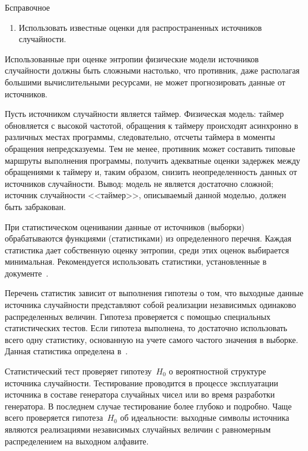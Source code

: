 \begin{appendix}{Б}{справочное}
\begin{enumerate}
\begin{example}
В проведенных экспериментах величина $h^*$ была не меньше $27,1$.
%
Нижняя граница достигалась для процессоров 
с минимально допустимой тактовой частотой $600$~МГц.
\end{example}

\item 
Использовать известные оценки для распространенных источников случайности.
\end{enumerate}

Использованные при оценке энтропии физические модели источников случайности 
должны быть сложными настолько, что противник, даже располагая большими 
вычислительными ресурсами, не может прогнозировать данные от источников. 

\begin{example}
Пусть источником случайности является таймер. 
Физическая модель: таймер обновляется с высокой частотой, обращения к 
таймеру происходят асинхронно в различных местах программы, 
следовательно, отсчеты таймера в моменты обращения непредсказуемы. 
Тем не менее, противник может составить типовые маршруты выполнения 
программы, получить адекватные оценки задержек между обращениями к 
таймеру и, таким образом, снизить неопределенность данных от 
источников случайности. Вывод: модель не является достаточно сложной; 
источник случайности <<таймер>>, описываемый данной моделью, должен быть 
забракован.
\end{example}

При статистическом оценивании данные от источников (выборки)
обрабатываются функциями (статистиками) из определенного перечня. 
Каждая статистика дает собственную оценку энтропии, среди этих оценок 
выбирается минимальная. Рекомендуется использовать статистики, установленные 
в документе~\cite{SP800-90B}.  

Перечень статистик зависит от выполнения гипотезы о том, что выходные 
данные источника случайности представляют собой реализации 
независимых одинаково распределенных величин. Гипотеза проверяется 
с помощью специальных статистических тестов.
%
Если гипотеза выполнена, то достаточно использовать всего одну статистику,
основанную на учете самого частого значения в выборке. Данная статистика определена 
в~\cite[п.~6.3.1]{SP800-90B}.

\label{RNG.StatTest}

Статистический тест проверяет гипотезу~$H_0$ о вероятностной структуре 
источника случайности.
%
Тестирование проводится в процессе эксплуатации источника в составе 
генератора случайных чисел или во время разработки генератора.
%
В последнем случае тестирование более глубоко и подробно.
%
Чаще всего проверяется гипотеза~$H_0$ об идеальности:
выходные символы источника являются реализациями независимых случайных величин  
с равномерным распределением на выходном алфавите.


\end{appendix}
